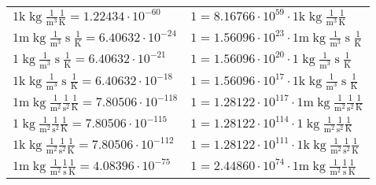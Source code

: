 \begin{center}
\begin{longtable}{l l}
{\color{gray}$1 \bm{\mathrm{ k}}\operatorname{kg}\frac1{\operatorname{m}^3}{}{}\frac1{\operatorname{K}} = 1.22434\cdot10^{-60} $}   & {\color{gray}$ 1 = 8.16766\cdot10^{59} \cdot 1 \bm{\mathrm{ k}}\operatorname{kg}\frac1{\operatorname{m}^3}{}{}\frac1{\operatorname{K}}$}  \\
{\color{gray}$1 \bm{\mathrm{ m}}\operatorname{kg}\frac1{\operatorname{m}^3}{\operatorname{s}}{}\frac1{\operatorname{K}} = 6.40632\cdot10^{-24} $}   & {\color{gray}$ 1 = 1.56096\cdot10^{23} \cdot 1 \bm{\mathrm{ m}}\operatorname{kg}\frac1{\operatorname{m}^3}{\operatorname{s}}{}\frac1{\operatorname{K}}$}  \\
{\color{black}$1 \bm{\mathrm{ }}\operatorname{kg}\frac1{\operatorname{m}^3}{\operatorname{s}}{}\frac1{\operatorname{K}} = 6.40632\cdot10^{-21} $}   & {\color{black}$ 1 = 1.56096\cdot10^{20} \cdot 1 \bm{\mathrm{ }}\operatorname{kg}\frac1{\operatorname{m}^3}{\operatorname{s}}{}\frac1{\operatorname{K}}$}  \\
{\color{gray}$1 \bm{\mathrm{ k}}\operatorname{kg}\frac1{\operatorname{m}^3}{\operatorname{s}}{}\frac1{\operatorname{K}} = 6.40632\cdot10^{-18} $}   & {\color{gray}$ 1 = 1.56096\cdot10^{17} \cdot 1 \bm{\mathrm{ k}}\operatorname{kg}\frac1{\operatorname{m}^3}{\operatorname{s}}{}\frac1{\operatorname{K}}$}  \\
{\color{gray}$1 \bm{\mathrm{ m}}\operatorname{kg}\frac1{\operatorname{m}^2}\frac1{\operatorname{s}^2}{}\frac1{\operatorname{K}} = 7.80506\cdot10^{-118} $}   & {\color{gray}$ 1 = 1.28122\cdot10^{117} \cdot 1 \bm{\mathrm{ m}}\operatorname{kg}\frac1{\operatorname{m}^2}\frac1{\operatorname{s}^2}{}\frac1{\operatorname{K}}$}  \\
{\color{black}$1 \bm{\mathrm{ }}\operatorname{kg}\frac1{\operatorname{m}^2}\frac1{\operatorname{s}^2}{}\frac1{\operatorname{K}} = 7.80506\cdot10^{-115} $}   & {\color{black}$ 1 = 1.28122\cdot10^{114} \cdot 1 \bm{\mathrm{ }}\operatorname{kg}\frac1{\operatorname{m}^2}\frac1{\operatorname{s}^2}{}\frac1{\operatorname{K}}$}  \\
{\color{gray}$1 \bm{\mathrm{ k}}\operatorname{kg}\frac1{\operatorname{m}^2}\frac1{\operatorname{s}^2}{}\frac1{\operatorname{K}} = 7.80506\cdot10^{-112} $}   & {\color{gray}$ 1 = 1.28122\cdot10^{111} \cdot 1 \bm{\mathrm{ k}}\operatorname{kg}\frac1{\operatorname{m}^2}\frac1{\operatorname{s}^2}{}\frac1{\operatorname{K}}$}  \\
{\color{gray}$1 \bm{\mathrm{ m}}\operatorname{kg}\frac1{\operatorname{m}^2}\frac1{\operatorname{s}}{}\frac1{\operatorname{K}} = 4.08396\cdot10^{-75} $}   & {\color{gray}$ 1 = 2.44860\cdot10^{74} \cdot 1 \bm{\mathrm{ m}}\operatorname{kg}\frac1{\operatorname{m}^2}\frac1{\operatorname{s}}{}\frac1{\operatorname{K}}$}  \\

\end{longtable}
\end{center}
